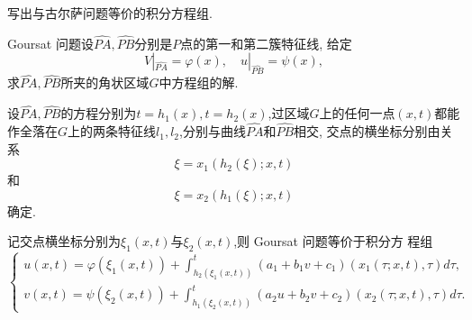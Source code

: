 \begin{exercise}
	写出与古尔萨问题等价的积分方程组.
\end{exercise}

\begin{solve}
	Goursat 问题设$\widehat{PA},\widehat{PB}$分别是$P$点的第一和第二簇特征线, 给定
	$$V|_{\widehat{PA}}=\varphi(x),\quad u|_{\widehat{PB}}=\psi(x),$$
	求$\widehat{PA},\widehat{PB}$所夹的角状区域$G$中方程组的解.
	
	设$\widehat{PA},\widehat{PB}$的方程分别为$t=h_1(x), t=h_2(x)$,过区域$G$上的任何一点$(x,t)$都能作全落在$G$上的两条特征线$l_1,l_2$,分别与曲线$\widehat{PA}$和$\widehat{PB}$相交,  交点的横坐标分别由关系
	$$\xi=x_1(h_2(\xi);x,t)$$
	和
	$$\xi=x_2(h_1(\xi);x,t)$$
	确定.
	
	记交点横坐标分别为$\xi_1(x,t)$与$\xi_2(x,t)$,则 Goursat 问题等价于积分方
	程组
	$$\begin{cases}
		\displaystyle u(x,t)=\varphi(\xi_1(x,t))+\int_{h_2(\xi_1(x,t))}^t(a_1+b_1v+c_1)(x_1(\tau;x,t),\tau)d\tau,\\
		\displaystyle v(x,t)=\psi(\xi_2(x,t))+\int_{h_1(\xi_2(x,t))}^t(a_2u+b_2v+c_2)(x_2(\tau;x,t),\tau)d\tau.
	\end{cases}$$
\end{solve}